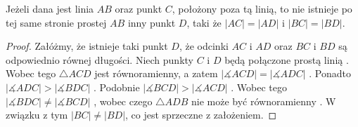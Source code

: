 \documentclass[12pt, a4paper]{scrartcl}
\begin{document}
\begin{theorem}
    Jeżeli dana jest linia \(AB\) oraz punkt \(C\), położony poza tą linią,
    to nie istnieje po tej same stronie prostej \(AB\) inny punkt \(D\), taki że
    \(|AC| = |AD|\) i \(|BC| = |BD|\).

    \begin{figure}[!ht]
        \begin{center}
        \end{center}
    \end{figure}

    \begin{proof}
      Załóżmy, że istnieje taki punkt \(D\), że odcinki \(AC\) i \(AD\) oraz
      \(BC\) i \(BD\) są odpowiednio równej długości. Niech punkty \(C\) i \(D\)
      będą połączone prostą linią . Wobec tego \(\triangle ACD\) jest
      równoramienny, a zatem \(|\measuredangle ACD| = |\measuredangle ADC|\)
      . Ponadto \(|\measuredangle ADC| > |\measuredangle BDC|\)
      . Podobnie \(|\measuredangle BCD| > |\measuredangle ACD|\)
      . Wobec tego \(|\measuredangle BDC| \neq |\measuredangle BCD|\)
      , wobec czego \(\triangle ADB\) nie może być równoramienny
      . W związku z tym \(|BC| \neq |BD|\), co jest sprzeczne z
      założeniem.
    \end{proof}
\end{theorem}
\end{document}
